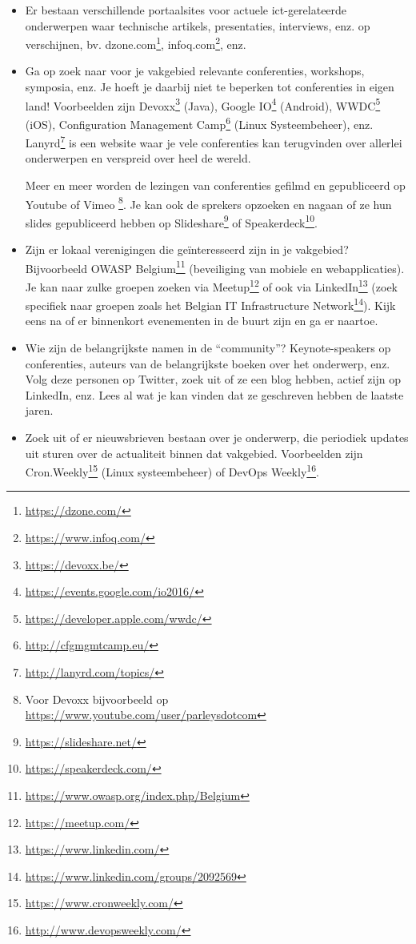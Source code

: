 \begin{itemize}
  \item Er bestaan verschillende portaalsites voor actuele ict-gerelateerde onderwerpen waar technische artikels, presentaties, interviews, enz. op verschijnen, bv. dzone.com\footnote{\url{https://dzone.com/}}, infoq.com\footnote{\url{https://www.infoq.com/}}, enz.
  \item Ga op zoek naar voor je vakgebied relevante conferenties, workshops, symposia, enz. Je hoeft je daarbij niet te beperken tot conferenties in eigen land! Voorbeelden zijn Devoxx\footnote{\url{https://devoxx.be/}} (Java), Google IO\footnote{\url{https://events.google.com/io2016/}} (Android), WWDC\footnote{\url{https://developer.apple.com/wwdc/}} (iOS), Configuration Management Camp\footnote{\url{http://cfgmgmtcamp.eu/}} (Linux Systeembeheer), enz. Lanyrd\footnote{\url{http://lanyrd.com/topics/}} is een website waar je vele conferenties kan terugvinden over allerlei onderwerpen en verspreid over heel de wereld.

    Meer en meer worden de lezingen van conferenties gefilmd en gepubliceerd op Youtube of Vimeo \footnote{Voor Devoxx bijvoorbeeld op \url{https://www.youtube.com/user/parleysdotcom}}. Je kan ook de sprekers opzoeken en nagaan of ze hun slides gepubliceerd hebben op Slideshare\footnote{\url{https://slideshare.net/}} of Speakerdeck\footnote{\url{https://speakerdeck.com/}}.
  \item Zijn er lokaal verenigingen die geïnteresseerd zijn in je vakgebied? Bijvoorbeeld OWASP Belgium\footnote{\url{https://www.owasp.org/index.php/Belgium}} (beveiliging van mobiele en webapplicaties). Je kan naar zulke groepen zoeken via Meetup\footnote{\url{https://meetup.com/}} of ook via LinkedIn\footnote{\url{https://www.linkedin.com/}} (zoek specifiek naar groepen zoals het Belgian IT Infrastructure Network\footnote{\url{https://www.linkedin.com/groups/2092569}}). Kijk eens na of er binnenkort evenementen in de buurt zijn en ga er naartoe.
  \item Wie zijn de belangrijkste namen in de ``community''? Keynote-speakers op conferenties, auteurs van de belangrijkste boeken over het onderwerp, enz. Volg deze personen op Twitter, zoek uit of ze een blog hebben, actief zijn op LinkedIn, enz. Lees al wat je kan vinden dat ze geschreven hebben de laatste jaren.
  \item Zoek uit of er nieuwsbrieven bestaan over je onderwerp, die periodiek updates uit sturen over de actualiteit binnen dat vakgebied. Voorbeelden zijn Cron.Weekly\footnote{\url{https://www.cronweekly.com/}} (Linux systeembeheer) of DevOps Weekly\footnote{\url{http://www.devopsweekly.com/}}.
\end{itemize}

